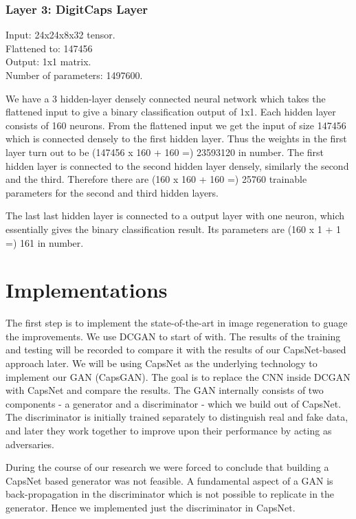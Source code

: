 \documentclass{vldb}
\begin{document}

\subsubsection{Layer 3: DigitCaps Layer} %
\label{sub:layer_3_digitcaps_layer}
\noindent Input: 24x24x8x32 tensor.
\\Flattened to: 147456
\\Output: 1x1 matrix.
\\Number of parameters: 1497600.

\par We have a 3 hidden-layer densely connected neural network which takes the flattened input to give a binary classification output of 1x1. Each hidden layer consists of 160 neurons. From the flattened input we get the input of size 147456 which is connected densely to the first hidden layer. Thus the weights in the first layer turn out to be (147456 x 160 + 160 =)  23593120 in number. The first hidden layer is connected to the second hidden layer densely, similarly the second and the third. Therefore there are (160 x 160 + 160 =) 25760 trainable parameters for the second and third hidden layers. 
\par The last last hidden layer is connected to a output layer with one neuron, which essentially gives the binary classification result. Its parameters are (160 x 1 + 1 =) 161 in number. 

\section{Implementations}
The first step is to implement the state-of-the-art in image regeneration to guage the improvements. We use DCGAN to start of with. The results of the training and testing will be recorded to compare it with the results of our CapsNet-based approach later. We will be using CapsNet as the underlying technology to implement our GAN (CapsGAN). The goal is to replace the CNN inside DCGAN with CapsNet and compare the results. The GAN internally consists of two components - a generator and a discriminator - which we build out of CapsNet. The discriminator is initially trained separately to distinguish real and fake data, and later they work together to improve upon their performance by acting as adversaries.
\par


During the course of our research we were forced to conclude that building a CapsNet based generator was not feasible. A fundamental aspect of a GAN is back-propagation in the discriminator which is not possible to replicate in the generator. Hence we implemented just the discriminator in CapsNet. 
\par
\end{document}
